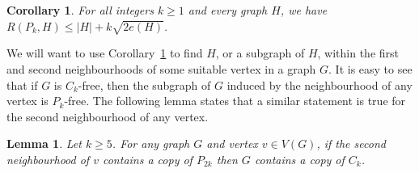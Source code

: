 \documentclass{article}
\newtheorem{lemma}[theorem]{Lemma}
\newtheorem{corollary}[theorem]{Corollary}
\newcommand{\kp}[1]{\textcolor{teal}{\textbf{[KP: } #1\textbf{]}}}
\newcommand{\scc}[1]{\textcolor{red}{\textbf{[SC: } #1\textbf{]}}}
\begin{document}
\begin{corollary}\label{cor:estR(Pk,H)}
For all integers $k \geq 1$ and every graph $H$, we have $R(P_k, H) \leq |H| + k \sqrt{2e(H)}$.
\end{corollary}

We will want to use Corollary~\ref{cor:estR(Pk,H)} to find $H$, or a subgraph of $H$, within the first and second neighbourhoods of some suitable vertex in a graph $G$.
It is easy to see that if $G$ is $C_k$-free, then the subgraph of $G$ induced by the neighbourhood of any vertex is $P_k$-free.
The following lemma states that a similar statement %
is true for the second neighbourhood of any vertex.
 
\begin{lemma}
\label{lemma:path_second_neighbourhood}
Let $k\ge5$. 
For any graph $G$ and vertex $v\in V(G)$, if the second neighbourhood of $v$ contains a copy of $P_{2k}$ then $G$ contains a copy of $C_k$.
\end{lemma}

\end{document}

